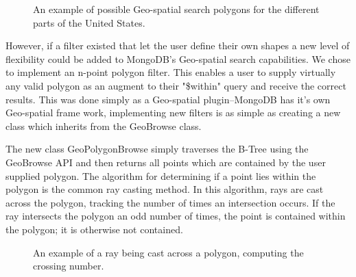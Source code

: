 \documentclass{../dependencies/acm_proc_article-sp}
\begin{document}
\begin{figure}[htb]
\centering
\setlength\fboxsep{0.5pt}
\setlength\fboxrule{0.5pt}
\caption{An example of possible Geo-spatial search polygons for the different parts of the United States\cite{5}.}
\end{figure}
 
However, if a filter existed that let the user define their own shapes a new level of flexibility could be 
added to MongoDB's Geo-spatial search capabilities. We chose to implement an n-point polygon filter.
This enables a user to supply virtually any valid polygon as an augment to their "\$within" query and receive the correct results.
This was done simply as a Geo-spatial plugin--MongoDB has it's own Geo-spatial frame work, implementing new filters is as 
simple as creating a new class which inherits from the GeoBrowse class.



The new class GeoPolygonBrowse simply traverses the B-Tree using the GeoBrowse API and then returns
all points which are contained by the user supplied polygon. The algorithm for determining if a point 
lies within the polygon is the common ray casting method. In this algorithm, rays are cast across the polygon,
tracking the number of times an intersection occurs. 
If the ray intersects the polygon an odd number of times, the point is contained within the
polygon; it is otherwise not contained.


\begin{figure}[htb]
\centering
\setlength\fboxsep{0.5pt}
\setlength\fboxrule{0.5pt}
\caption{An example of a ray being cast across a polygon, computing the crossing number\cite{6}.}
\end{figure}
\end{document}
